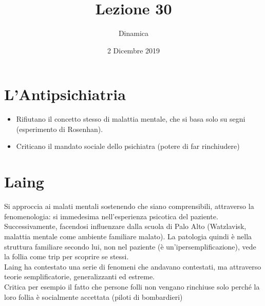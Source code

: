 \documentclass[12pt, a4paper]{article}
\date{2 Dicembre 2019}
\title{Lezione 30}
\author{Dinamica}
\begin{document}
\maketitle

\section{L'Antipsichiatria}

\begin{itemize}
    \item Rifiutano il concetto stesso di malattia mentale, che si basa solo su segni (esperimento di Rosenhan).
    \item Criticano il mandato sociale dello psichiatra (potere di far rinchiudere)
\end{itemize}

\section{Laing}
Si approccia ai malati mentali sostenendo che siano comprensibili, attraverso la fenomenologia: si immedesima nell'esperienza psicotica del pazien\-te.
\medskip\\ 
Successivamente, facendosi influenzare dalla scuola di Palo Alto (Watzlavisk, malattia mentale come ambiente familiare malato).
La patologia quindi è nella struttura familiare secondo lui, non nel paziente (è un'iper\-semp\-lificazione), vede la follia come trip per scoprire se stessi.
\medskip\\ 
Laing ha contestato una serie di fenomeni che andavano contestati, ma attraverso teorie semplificatorie, generalizzanti ed estreme.
\medskip\\ 
Critica per esempio il fatto che persone folli non vengano rinchiuse solo perché la loro follia è socialmente accettata (piloti di bombardieri)
\end{document}
